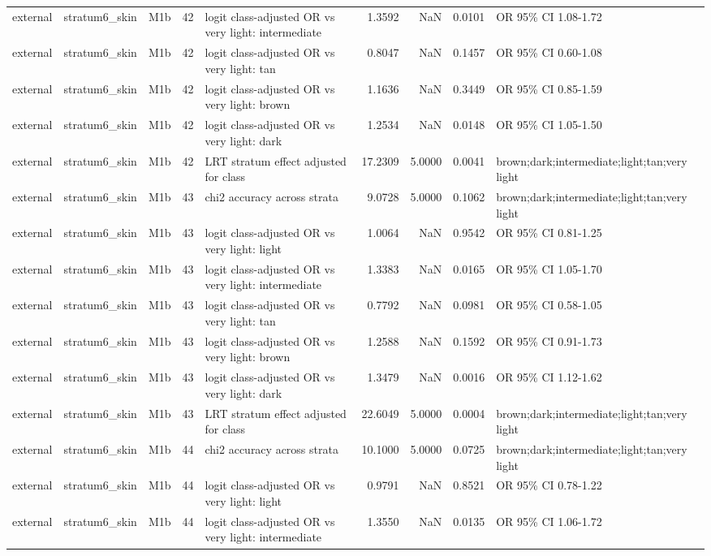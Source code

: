 \begin{tabular}{lllrlrrrl}
external & stratum6\_skin & M1b & 42 & logit class-adjusted OR vs very light: intermediate & 1.3592 & NaN & 0.0101 & OR 95\% CI 1.08-1.72 \\
external & stratum6\_skin & M1b & 42 & logit class-adjusted OR vs very light: tan & 0.8047 & NaN & 0.1457 & OR 95\% CI 0.60-1.08 \\
external & stratum6\_skin & M1b & 42 & logit class-adjusted OR vs very light: brown & 1.1636 & NaN & 0.3449 & OR 95\% CI 0.85-1.59 \\
external & stratum6\_skin & M1b & 42 & logit class-adjusted OR vs very light: dark & 1.2534 & NaN & 0.0148 & OR 95\% CI 1.05-1.50 \\
external & stratum6\_skin & M1b & 42 & LRT stratum effect adjusted for class & 17.2309 & 5.0000 & 0.0041 & brown;dark;intermediate;light;tan;very light \\
external & stratum6\_skin & M1b & 43 & chi2 accuracy across strata & 9.0728 & 5.0000 & 0.1062 & brown;dark;intermediate;light;tan;very light \\
external & stratum6\_skin & M1b & 43 & logit class-adjusted OR vs very light: light & 1.0064 & NaN & 0.9542 & OR 95\% CI 0.81-1.25 \\
external & stratum6\_skin & M1b & 43 & logit class-adjusted OR vs very light: intermediate & 1.3383 & NaN & 0.0165 & OR 95\% CI 1.05-1.70 \\
external & stratum6\_skin & M1b & 43 & logit class-adjusted OR vs very light: tan & 0.7792 & NaN & 0.0981 & OR 95\% CI 0.58-1.05 \\
external & stratum6\_skin & M1b & 43 & logit class-adjusted OR vs very light: brown & 1.2588 & NaN & 0.1592 & OR 95\% CI 0.91-1.73 \\
external & stratum6\_skin & M1b & 43 & logit class-adjusted OR vs very light: dark & 1.3479 & NaN & 0.0016 & OR 95\% CI 1.12-1.62 \\
external & stratum6\_skin & M1b & 43 & LRT stratum effect adjusted for class & 22.6049 & 5.0000 & 0.0004 & brown;dark;intermediate;light;tan;very light \\
external & stratum6\_skin & M1b & 44 & chi2 accuracy across strata & 10.1000 & 5.0000 & 0.0725 & brown;dark;intermediate;light;tan;very light \\
external & stratum6\_skin & M1b & 44 & logit class-adjusted OR vs very light: light & 0.9791 & NaN & 0.8521 & OR 95\% CI 0.78-1.22 \\
external & stratum6\_skin & M1b & 44 & logit class-adjusted OR vs very light: intermediate & 1.3550 & NaN & 0.0135 & OR 95\% CI 1.06-1.72 \\

\end{tabular}
